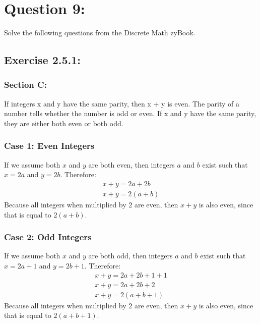 \documentclass[titlepage]{article}\pagestyle{empty}
\begin{document}
\pagebreak
\section*{Question 9:}
Solve the following questions from the Discrete Math zyBook.
\subsection*{Exercise 2.5.1:}
\subsubsection*{Section C:} If integers x and y have the same parity, then x + y is even. The parity of a number tells whether the number is odd or even. If x and y have the same parity, they are either both even or both odd.
\subsubsection*{\textbf{Case 1: Even Integers}}
If we assume both $x$ and $y$ are both even, then integers $a$ and $b$ exist such that $x = 2a$ and $y = 2b$. Therefore:
\begin{displaymath}
\begin{array}{c}
x + y = 2a + 2b\\
x + y = 2(a + b)
\end{array}
\end{displaymath}
Because all integers when multiplied by $2$ are even, then $x + y$ is also even, since that is equal to $2(a + b)$.
\subsubsection*{\textbf{Case 2: Odd Integers}}
If we assume both $x$ and $y$ are both odd, then integers $a$ and $b$ exist such that $x = 2a + 1$ and $y = 2b + 1$. Therefore:
\begin{displaymath}
\begin{array}{c}
x + y = 2a + 2b + 1 + 1\\
x + y = 2a + 2b + 2\\
x + y = 2(a + b + 1)
\end{array}
\end{displaymath}
Because all integers when multiplied by $2$ are even, then $x + y$ is also even, since that is equal to $2(a + b + 1)$.
\end{document}
